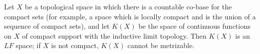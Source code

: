 Let $X$ be a topological space in which there is a countable co-base for the compact sets (for example, a space which is locally compact and is the union of a sequence of compact sets), and let $K(X)$ be the space of continuous functions on $X$ of compact support with the inductive limit topology. Then $K(X)$ is an $LF$ space; if $X$ is not compact, $K(X)$ cannot be metrizable.
